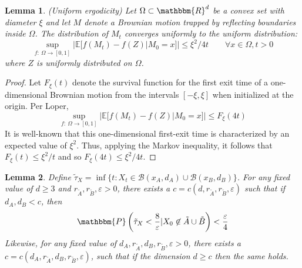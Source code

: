 \documentclass[english, aip, jcp, priprint, graphicx,floatfix]{revtex4-1}
\newtheorem{lemma}{Lemma}
\theoremstyle{plain}
\theoremstyle{definition}
\theoremstyle{plain}
\begin{document}

\begin{lemma}
\label{lem:uniform_ergodicity}(Uniform ergodicity) Let $\Omega\subset\mathbbm{R}^d$ be a convex set with diameter $\xi$ and let $M$ denote a Brownian motion trapped by reflecting boundaries inside $\Omega$.  The distribution of $M_t$ converges uniformly to the uniform distribution:
%
\[ 
\sup_{f:\ \Omega\rightarrow [0,1]} | \mathbb{E}[f(M_t) - f(Z)|M_0=x]| \leq \xi^2/4t \qquad \forall x\in \Omega, t>0
\]
%
where $Z$ is uniformly distributed on $\Omega$.
\end{lemma}
\begin{proof}
Let $F_\xi(t)$ denote the survival function for the first exit time of a one-dimensional Brownian motion from the intervals $[-\xi,\xi]$ when initialized at the origin.  Per Loper,\cite{Loper2018} 
\[
\sup_{f:\ \Omega\rightarrow [0,1]} | \mathbb{E}[f(M_t) - f(Z)|M_0=x]| \leq F_\xi(4t)
\]
It is well-known that this one-dimensional first-exit time is characterized by an expected value of $\xi^2$.  Thus, applying the Markov inequality, it follows that $F_\xi(t) \leq \xi^2 / t$ and so $F_\xi(4t) \leq \xi^2 / 4t$. 
\end{proof}

\begin{lemma}
\label{lem:longtime}Define $\tilde{\tau}_X = \inf \{ t : X_t \in \mathcal{B}
(x_A, d_A) \cup \mathcal{B} (x_B, d_B) \}$. For any fixed value of $d
\geqslant 3$ and $r_{\tilde{A}}, r_{\tilde{B}}, \varepsilon > 0$, there
exists a $c = c (d, r_{\tilde{A}}, r_{\tilde{B}}, \varepsilon)$ such that if
$d_A, d_B < c$, then
\[ \mathbbm{P} \left( \tilde{\tau}_X < \frac{8}{\varepsilon} |X_0 \not\in
\tilde{A} \cup \tilde{B} \right) < \frac{\varepsilon}{4} \]
Likewise, for any fixed value of $d_A, r_{\tilde{A}}, d_B, r_{\tilde{B}},
\varepsilon > 0$, there exists a $c = c (d_A, r_{\tilde{A}}, d_B,
r_{\tilde{B}}, \varepsilon)$, such that if the dimension $d \geqslant c$
then the same holds.
\end{lemma}
\end{document}

